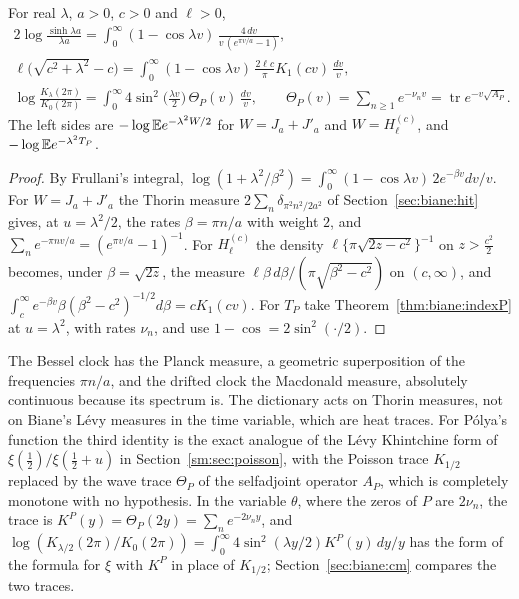 \begin{proposition}\label{prop:biane:sin2}
For real $\lambda$, $a>0$, $c>0$ and $\ell>0$,
\begin{gather*}
2\log\frac{\sinh\lambda a}{\lambda a}=\int_0^\infty(1-\cos\lambda v)\,\frac{4\,dv}{v\,(e^{\pi v/a}-1)},\\
\ell\big(\sqrt{c^2+\lambda^2}-c\big)=\int_0^\infty(1-\cos\lambda v)\,\frac{2\ell c}\pi K_1(cv)\,\frac{dv}v,\\
\log\frac{K_\lambda(2\pi)}{K_0(2\pi)}=\int_0^\infty4\sin^2\Big(\frac{\lambda v}2\Big)\,\Theta_P(v)\,\frac{dv}v,\qquad\Theta_P(v)=\sum_{n\ge1}e^{-\nu_nv}=\operatorname{tr}e^{-v\sqrt{A_P}} .
\end{gather*}
The left sides are $-\log\mathbb{E} e^{-\lambda^2W/2}$ for $W=J_a+J'_a$ and $W=H^{(c)}_\ell$, and $-\log\mathbb{E} e^{-\lambda^2T_P}$.
\end{proposition}

\begin{proof}
By Frullani's integral, $\log(1+\lambda^2/\beta^2)=\int_0^\infty(1-\cos\lambda v)\,2e^{-\beta v}dv/v$. For $W=J_a+J'_a$ the Thorin measure $2\sum_n\delta_{\pi^2n^2/2a^2}$ of Section~\ref{sec:biane:hit} gives, at $u=\lambda^2/2$, the rates $\beta=\pi n/a$ with weight $2$, and $\sum_ne^{-\pi nv/a}=(e^{\pi v/a}-1)^{-1}$. For $H^{(c)}_\ell$ the density $\ell\{\pi\sqrt{2z-c^2}\}^{-1}$ on $z>\frac{c^2}2$ becomes, under $\beta=\sqrt{2z}$, the measure $\ell\beta\,d\beta/(\pi\sqrt{\beta^2-c^2})$ on $(c,\infty)$, and $\int_c^\infty e^{-\beta v}\beta(\beta^2-c^2)^{-1/2}d\beta=cK_1(cv)$. For $T_P$ take Theorem~\ref{thm:biane:indexP} at $u=\lambda^2$, with rates $\nu_n$, and use $1-\cos=2\sin^2(\cdot/2)$.
\end{proof}

The Bessel clock has the Planck measure, a geometric superposition of the frequencies $\pi n/a$, and the drifted clock the Macdonald measure, absolutely continuous because its spectrum is. The dictionary acts on Thorin measures, not on Biane's L\'evy measures in the time variable, which are heat traces. For P\'olya's function the third identity is the exact analogue of the L\'evy Khintchine form of $\xi(\frac12)/\xi(\frac12+u)$ in Section~\ref{sm:sec:poisson}, with the Poisson trace $K_{1/2}$ replaced by the wave trace $\Theta_P$ of the selfadjoint operator $A_P$, which is completely monotone with no hypothesis. In the variable $\theta$, where the zeros of $P$ are $2\nu_n$, the trace is $K^P(y)=\Theta_P(2y)=\sum_ne^{-2\nu_ny}$, and $\log(K_{\lambda/2}(2\pi)/K_0(2\pi))=\int_0^\infty4\sin^2(\lambda y/2)K^P(y)\,dy/y$ has the form of the formula for $\xi$ with $K^P$ in place of $K_{1/2}$; Section~\ref{sec:biane:cm} compares the two traces.

